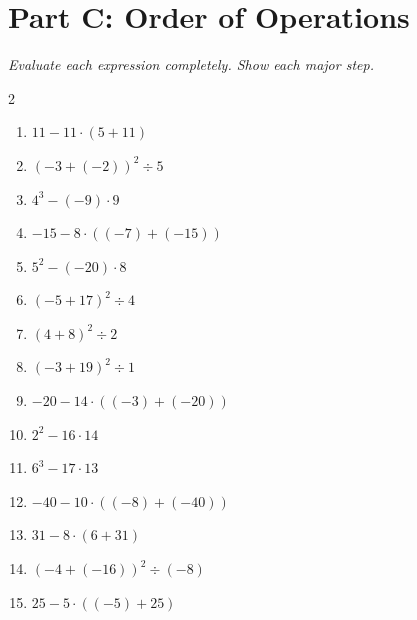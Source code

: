 \documentclass[11pt]{article}
\begin{document}
\section*{Part C: Order of Operations}
\noindent\textit{Evaluate each expression completely. Show each major step.}
\begin{multicols}{2}
\begin{enumerate}
  \item $11 - 11 \cdot (5 + 11)$
  \vspace{1.3cm}
  \item $(-3 + (-2))^{2} \div 5$
  \vspace{1.3cm}
  \item $4^{3} - (-9) \cdot 9$
  \vspace{1.3cm}
  \item $-15 - 8 \cdot ((-7) + (-15))$
  \vspace{1.3cm}
  \item $5^{2} - (-20) \cdot 8$
  \vspace{1.3cm}
  \item $(-5 + 17)^{2} \div 4$
  \vspace{1.3cm}
  \item $(4 + 8)^{2} \div 2$
  \vspace{1.3cm}
  \item $(-3 + 19)^{2} \div 1$
  \vspace{1.3cm}
  \item $-20 - 14 \cdot ((-3) + (-20))$
  \vspace{1.3cm}
  \item $2^{2} - 16 \cdot 14$
  \vspace{1.3cm}
  \item $6^{3} - 17 \cdot 13$
  \vspace{1.3cm}
  \item $-40 - 10 \cdot ((-8) + (-40))$
  \vspace{1.3cm}
  \item $31 - 8 \cdot (6 + 31)$
  \vspace{1.3cm}
  \item $(-4 + (-16))^{2} \div (-8)$
  \vspace{1.3cm}
  \item $25 - 5 \cdot ((-5) + 25)$
  \vspace{1.3cm}
\end{enumerate}
\end{multicols}
\end{document}

